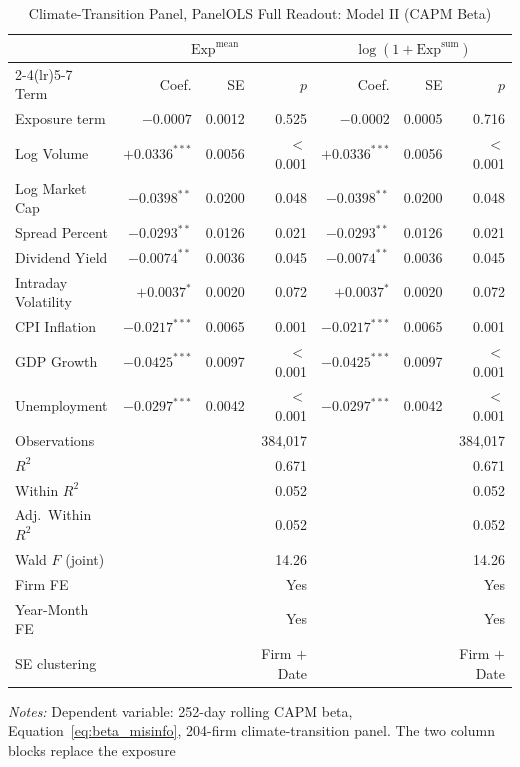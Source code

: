 \begin{table}[htbp]
\centering
\caption{Climate-Transition Panel, PanelOLS Full Readout: Model II (CAPM Beta)}
\label{tab:v2_full_modelII}
\begin{threeparttable}
\small
\setlength{\tabcolsep}{4pt}
\begin{tabular}{l r r r r r r}
\toprule
 & \multicolumn{3}{c}{$\mathrm{Exp}^{\text{mean}}$} & \multicolumn{3}{c}{$\log(1+\mathrm{Exp}^{\text{sum}})$} \\
\cmidrule(lr){2-4}\cmidrule(lr){5-7}
Term & Coef. & SE & $p$ & Coef. & SE & $p$ \\
\midrule
Exposure term & $-0.0007$ & 0.0012 & 0.525 & $-0.0002$ & 0.0005 & 0.716 \\
Log Volume & $+0.0336^{***}$ & 0.0056 & $<$0.001 & $+0.0336^{***}$ & 0.0056 & $<$0.001 \\
Log Market Cap & $-0.0398^{**}$ & 0.0200 & 0.048 & $-0.0398^{**}$ & 0.0200 & 0.048 \\
Spread Percent & $-0.0293^{**}$ & 0.0126 & 0.021 & $-0.0293^{**}$ & 0.0126 & 0.021 \\
Dividend Yield & $-0.0074^{**}$ & 0.0036 & 0.045 & $-0.0074^{**}$ & 0.0036 & 0.045 \\
Intraday Volatility & $+0.0037^{*}$ & 0.0020 & 0.072 & $+0.0037^{*}$ & 0.0020 & 0.072 \\
CPI Inflation & $-0.0217^{***}$ & 0.0065 & 0.001 & $-0.0217^{***}$ & 0.0065 & 0.001 \\
GDP Growth & $-0.0425^{***}$ & 0.0097 & $<$0.001 & $-0.0425^{***}$ & 0.0097 & $<$0.001 \\
Unemployment & $-0.0297^{***}$ & 0.0042 & $<$0.001 & $-0.0297^{***}$ & 0.0042 & $<$0.001 \\
\midrule
Observations & & & 384,017 & & & 384,017 \\
$R^2$ & & & 0.671 & & & 0.671 \\
Within $R^2$ & & & 0.052 & & & 0.052 \\
Adj.\ Within $R^2$ & & & 0.052 & & & 0.052 \\
Wald $F$ (joint) & & & 14.26 & & & 14.26 \\
Firm FE & & & Yes & & & Yes \\
Year-Month FE & & & Yes & & & Yes \\
SE clustering & & & Firm $+$ Date & & & Firm $+$ Date \\
\bottomrule
\end{tabular}
\begin{tablenotes}
\small
\item \textit{Notes:} Dependent variable: 252-day rolling CAPM beta, Equation~\ref{eq:beta_misinfo}, 204-firm climate-transition panel. The two column blocks replace the exposure

\end{tablenotes}
\end{threeparttable}
\end{table}
